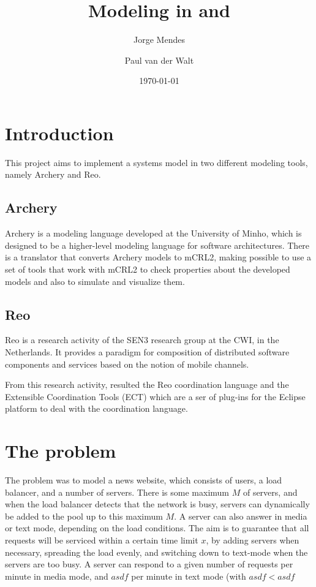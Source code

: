 \documentclass[a4paper]{article}
\author{Jorge Mendes \and Paul van der Walt}
\date{\today}
\title{Modeling in \ar and \re}
\newcommand{\ar}{Archery\xspace}
\newcommand{\re}{Reo\xspace}
\newcommand{\mcrl}{mCRL2\xspace}
\begin{document}
\maketitle

\section{Introduction}

This project aims to implement a systems model in two different modeling tools,
namely \ar and \re.

\subsection{\ar}

\ar is a modeling language developed at the University of Minho, which is designed
to be a higher-level modeling language for software architectures. There is a translator
that converts \ar models to \mcrl, making possible to use a set of tools that work with
\mcrl to check properties about the developed models and also to simulate and visualize them.

\subsection{\re}

\re is a research activity of the SEN3 research group at the CWI, in the
Netherlands. It provides a paradigm for composition of distributed software
components and services based on the notion of mobile channels.

From this research activity, resulted the \re coordination language and the
Extensible Coordination Tools (ECT) which are a ser of plug-ins for the Eclipse
platform to deal with the coordination language.

\section{The problem}

The problem was to model a news website, which consists of users, a load
balancer, and a number of servers. There is some maximum $M$ of servers, and
when the load balancer detects that the network is busy, servers can dynamically
be added to the pool up to this maximum $M$. A server can also answer in media
or text mode, depending on the load conditions. The aim is to guarantee that all
requests will be serviced within a certain time limit $x$, by adding servers
when necessary, spreading the load evenly, and switching down to text-mode when
the servers are too busy. A server can respond to a given number of requests per
minute in media mode, and $asdf$ per minute in text mode (with $asdf<asdf$
\end{document}
